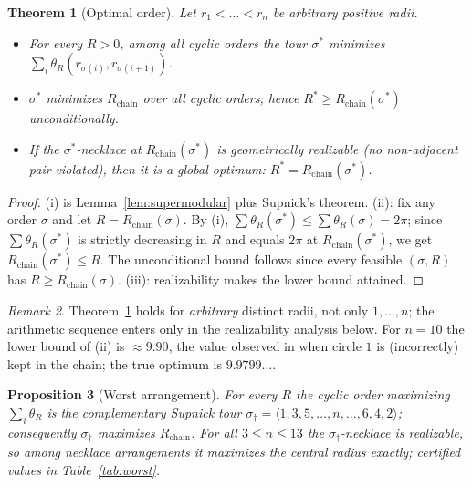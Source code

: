 \documentclass[11pt]{article}
\newtheorem{theorem}{Theorem}
\newtheorem{proposition}[theorem]{Proposition}
\theoremstyle{definition}
\theoremstyle{remark}
\newtheorem{remark}[theorem]{Remark}
\begin{document}
\begin{theorem}[Optimal order]\label{thm:A}
Let $r_1<\dots<r_n$ be arbitrary positive radii.
\begin{itemize}
\item[(i)] For every $R>0$, among all cyclic orders the tour $\sigma^\ast$ minimizes $\sum_i\theta_R(r_{\sigma(i)},r_{\sigma(i+1)})$.
\item[(ii)] $\sigma^\ast$ minimizes $R_{\mathrm{chain}}$ over all cyclic orders; hence $R^\ast\ge R_{\mathrm{chain}}(\sigma^\ast)$ unconditionally.
\item[(iii)] If the $\sigma^\ast$-necklace at $R_{\mathrm{chain}}(\sigma^\ast)$ is geometrically realizable (no non-adjacent pair violated), then it is a global optimum: $R^\ast=R_{\mathrm{chain}}(\sigma^\ast)$.
\end{itemize}
\end{theorem}

\begin{proof}
(i) is Lemma~\ref{lem:supermodular} plus Supnick's theorem. (ii): fix any order $\sigma$ and let $R=R_{\mathrm{chain}}(\sigma)$. By (i), $\sum\theta_{R}(\sigma^\ast)\le\sum\theta_{R}(\sigma)=2\pi$; since $\sum\theta_R(\sigma^\ast)$ is strictly decreasing in $R$ and equals $2\pi$ at $R_{\mathrm{chain}}(\sigma^\ast)$, we get $R_{\mathrm{chain}}(\sigma^\ast)\le R$. The unconditional bound follows since every feasible $(\sigma,R)$ has $R\ge R_{\mathrm{chain}}(\sigma)$. (iii): realizability makes the lower bound attained.
\end{proof}

\begin{remark}
Theorem~\ref{thm:A} holds for \emph{arbitrary} distinct radii, not only $1,\dots,n$; the arithmetic sequence enters only in the realizability analysis below. For $n=10$ the lower bound of (ii) is $\approx 9.90$, the value observed in \cite{mse} when circle $1$ is (incorrectly) kept in the chain; the true optimum is $9.9799\ldots$.
\end{remark}

\begin{proposition}[Worst arrangement]\label{prop:worst}
For every $R$ the cyclic order maximizing $\sum_i\theta_R$ is the complementary Supnick tour $\sigma_\dagger=\langle1,3,5,\dots,n,\dots,6,4,2\rangle$; consequently $\sigma_\dagger$ maximizes $R_{\mathrm{chain}}$. For all $3\le n\le13$ the $\sigma_\dagger$-necklace is realizable, so among necklace arrangements it maximizes the central radius exactly; certified values in Table~\ref{tab:worst}.
\end{proposition}
\end{document}
